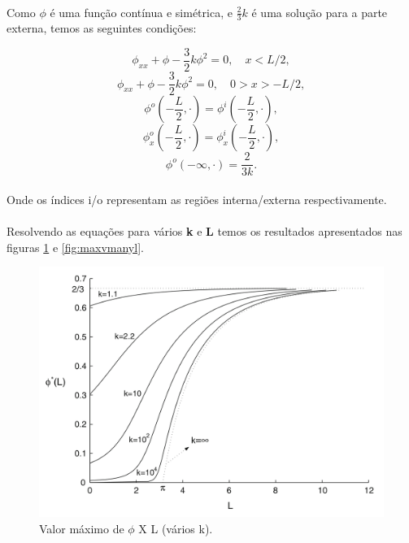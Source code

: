 \documentclass{article}
\begin{document}
	\paragraph{}
	Como $\phi$ é uma função contínua e simétrica, e $\frac{2}{3}k$ é uma solução para a parte externa, temos as seguintes condições:
	
	$$\phi_{xx} + \phi - \frac{3}{2}k\phi^2 = 0, \quad x < L/2,$$
	$$\phi_{xx} + \phi - \frac{3}{2}k\phi^2 = 0, \quad 0 > x > -L/2,$$
	$$\phi^o\left(-\frac{L}{2}, \cdot \right) = \phi^i\left(-\frac{L}{2}, \cdot \right),$$
	$$\phi^o_x\left(-\frac{L}{2}, \cdot \right) = \phi^i_x\left(-\frac{L}{2}, \cdot \right),$$
	$$\phi^o(- \infty, \cdot) = \frac{2}{3k}.$$
	
	\paragraph{}
	Onde os índices i/o representam as regiões interna/externa respectivamente.
	
	\paragraph{}
	Resolvendo as equações para vários \textbf{k} e \textbf{L} temos os resultados apresentados nas figuras \ref{fig:maxvmanyk} e \ref{fig:maxvmanyl}.
	
	\begin{figure}[h]
		\centering
		\includegraphics[scale=0.2]{MaxV-ManyK}
		\caption{Valor máximo de $\phi$ X L (vários k).}
		\label{fig:maxvmanyk}
	\end{figure}
\end{document}

